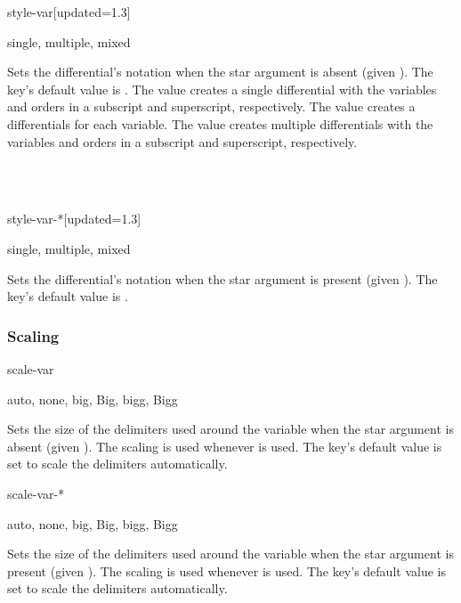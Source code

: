 \begin{option}{style-var}[updated=1.3]
	\begin{values}[default = multiple]
		single, multiple, mixed
	\end{values}
	Sets the differential's notation when the star argument is absent (given ). The key's default value is . The value  creates a single differential with the variables and orders in a subscript and superscript, respectively. The value  creates a differentials for each variable. The value  creates multiple differentials with the variables and orders in a subscript and superscript, respectively.
	\begin{example}
		 \\
		 \\
	\end{example}
\end{option}

\begin{option}{style-var-*}[updated=1.3]
	\begin{values}[default = single]
		single, multiple, mixed
	\end{values}
	Sets the differential's notation when the star argument is present (given ). The key's default value is .
\end{option}

\subsubsection*{Scaling}

\begin{option}{scale-var}
	\begin{values}[default = auto]
		auto, none, big, Big, bigg, Bigg
	\end{values}
	Sets the size of the delimiters used around the variable when the star argument is absent (given ). The scaling is used whenever  is used. The key's default value is set to scale the delimiters automatically.
\end{option}

\begin{option}{scale-var-*}
	\begin{values}[default = auto]
		auto, none, big, Big, bigg, Bigg
	\end{values}
	Sets the size of the delimiters used around the variable when the star argument is present (given ). The scaling is used whenever  is used. The key's default value is set to scale the delimiters automatically.
\end{option}

